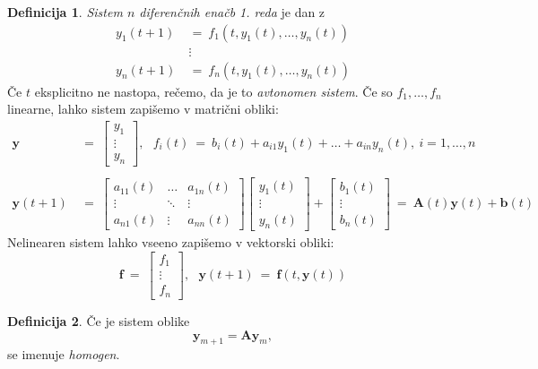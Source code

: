 \documentclass[11pt]{article}
\renewcommand{\b}{\mathbf{b}}
\newcommand{\f}{\mathbf{f}}
\newcommand{\y}{\mathbf{y}}
\newcommand{\A}{\mathbf{A}}
\theoremstyle{definition}
\newtheorem{definicija}{Definicija}[section]
\theoremstyle{definition}
\theoremstyle{definition}
\theoremstyle{definition}
\begin{document}
\begin{definicija}

\textit{Sistem $n$ diferenčnih enačb 1. reda} je dan z
\begin{align*}
y_1(t+1) ~&=~ f_1(t,y_1(t),\ldots,y_n(t)) \\
&\vdots \\
y_n(t+1) ~&=~ f_n(t,y_1(t),\ldots,y_n(t))
\end{align*} 
Če $t$ eksplicitno ne nastopa, rečemo, da je to \textit{avtonomen sistem}. Če so $f_1,\ldots,f_n$ linearne, lahko sistem zapišemo v matrični obliki:
\begin{align*}
\y ~&=~ \begin{bmatrix}
y_1 \\
\vdots \\
y_n
\end{bmatrix},~~~ f_i(t) ~=~ b_i(t) + a_{i1}y_1(t) + \ldots + a_{in}y_n(t), ~i = 1,\ldots, n\\ \\
\y(t+1) ~&=~ \begin{bmatrix}
a_{11}(t) & \ldots & a_{1n}(t) \\
\vdots & \ddots & \vdots \\
a_{n1}(t) & \vdots & a_{nn}(t)
\end{bmatrix} \begin{bmatrix}
y_1(t) \\
\vdots \\
y_n(t) 
\end{bmatrix} + \begin{bmatrix}
b_1(t) \\
\vdots \\
b_n(t)
\end{bmatrix} ~=~ \A(t)\y(t) + \b(t)
\end{align*}
Nelinearen sistem lahko vseeno zapišemo v vektorski obliki:
$$\f ~=~ \begin{bmatrix}
f_1 \\
\vdots \\
f_n
\end{bmatrix}, ~~~ \y(t+1) ~=~ \f(t, \y(t))$$

\end{definicija}
\vspace{0.5cm}

\begin{definicija}

Če je sistem oblike
$$\y_{m+1} = \A\y_m,$$
se imenuje \textit{homogen}.

\end{definicija}
\vspace{0.5cm}
\end{document}
